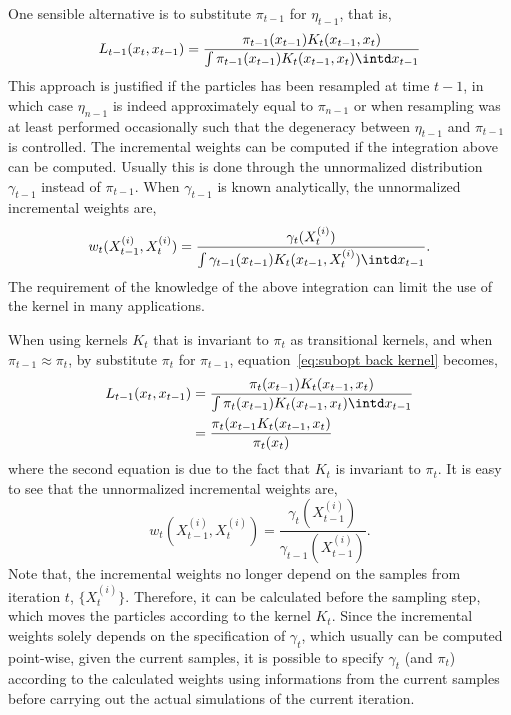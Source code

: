 One sensible alternative is to substitute $\pi_{t-1}$ for $\eta_{t-1}$, that
is,
\begin{equation}
  L_{t-1}(x_t,x_{t-1}) =
  \frac{\pi_{t-1}(x_{t-1})K_t(x_{t-1},x_t)}
  {\int \pi_{t-1}(x_{t-1})K_t(x_{t-1},x_t)\intd x_{t-1}}
  \label{eq:subopt back kernel}
\end{equation}
This approach is justified if the particles has been resampled at time $t-1$,
in which case $\eta_{n-1}$ is indeed approximately equal to $\pi_{n-1}$ or
when resampling was at least performed occasionally such that the degeneracy
between $\eta_{t-1}$ and $\pi_{t-1}$ is controlled. The incremental weights
can be computed if the integration above can be computed. Usually this is done
through the unnormalized distribution $\gamma_{t-1}$ instead of $\pi_{t-1}$.
When $\gamma_{t-1}$ is known analytically, the unnormalized incremental
weights are,
\begin{equation}
  w_t(X_{t-1}^{(i)},X_t^{(i)}) =
  \frac{\gamma_t(X_t^{(i)})}
  {\int\gamma_{t-1}(x_{t-1})K_t(x_{t-1},X_t^{(i)})\intd x_{t-1}}.
  \label{eq:inc weight subopt}
\end{equation}
The requirement of the knowledge of the above integration can limit the use of
the kernel in many applications.

When using \mcmc kernels $K_t$ that is invariant to $\pi_t$ as transitional
kernels, and when $\pi_{t-1}\approx\pi_t$, by substitute $\pi_t$ for
$\pi_{t-1}$, equation~\eqref{eq:subopt back kernel} becomes,
\begin{align}
  L_{t-1}(x_t,x_{t-1})
  &= \frac{\pi_t(x_{t-1})K_t(x_{t-1},x_t)}
  {\int \pi_t(x_{t-1})K_t(x_{t-1},x_t)\intd x_{t-1}} \notag\\
  &= \frac{\pi_t(x_{t-1}K_t(x_{t-1},x_t)}{\pi_t(x_t)}
  \label{eq:subopt back kernel mcmc}
\end{align}
where the second equation is due to the fact that $K_t$ is invariant to
$\pi_t$. It is easy to see that the unnormalized incremental weights are,
\begin{equation}
  w_t(X_{t-1}^{(i)},X_t^{(i)}) =
  \frac{\gamma_t(X_{t-1}^{(i)})}{\gamma_{t-1}(X_{t-1}^{(i)})}.
  \label{eq:inc weight subopt mcmc}
\end{equation}
Note that, the incremental weights no longer depend on the samples from
iteration $t$, $\{X_t^{(i)}\}$. Therefore, it can be calculated before the
sampling step, which moves the particles according to the kernel $K_t$. Since
the incremental weights solely depends on the specification of $\gamma_t$,
which usually can be computed point-wise, given the current samples, it is
possible to specify $\gamma_t$ (and $\pi_t$) according to the calculated
weights using informations from the current samples before carrying out the
actual simulations of the current iteration.


